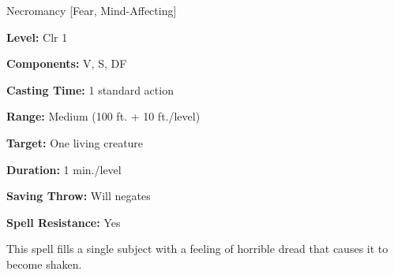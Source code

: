 
Necromancy [Fear, Mind-Affecting]

\textbf{Level:} Clr 1

\textbf{Components:} V, S, DF

\textbf{Casting Time:} 1 standard action

\textbf{Range:} Medium (100 ft. + 10 ft./level)

\textbf{Target:} One living creature

\textbf{Duration:} 1 min./level

\textbf{Saving Throw:} Will negates

\textbf{Spell Resistance:} Yes

This spell fills a single subject with a feeling of horrible dread that causes 
it to become shaken.

